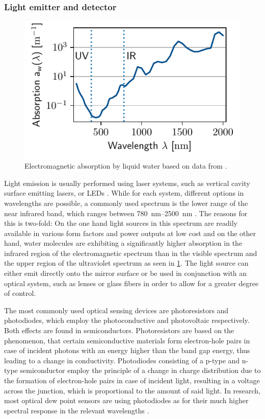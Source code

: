 \subsubsection{Light emitter and detector}
\begin{figure}
    \centering
    \includegraphics{graphs/waterabsorption.pdf}
    \caption{Electromagnetic absorption by liquid water based on data from \autocite{aasVerticalTransferInfrared2006,smithOpticalPropertiesClearest1981}.}
    \label{g:waterabsorption}
\end{figure}
Light emission is usually performed using laser systems, such as vertical cavity surface emitting lasers, or LEDs \autocite{chenHumiditySensorsReview2005,sweeneySemiconductorLasers2017}. While for each system, different options in wavelengths are possible, a commonly used spectrum is the lower range of the near infrared band, which ranges between \qtyrange{780}{2500}{\nano\m} . The reasons for this is two-fold: On the one hand light sources in this spectrum are readily available in various form factors and power outputs at low cost and on the other hand, water molecules are exhibiting a significantly higher absorption in the infrared region of the electromagnetic spectrum than in the visible spectrum and the upper region of the ultraviolet spectrum as seen in \cref{g:waterabsorption}. The light source can either emit directly onto the mirror surface or be used in conjunction with an optical system, such as lenses or glass fibers in order to allow for a greater degree of control.

The most commonly used optical sensing devices are photoresistors and photodiodes, which employ the photoconductive and photovoltaic respectively. Both effects are found in semiconductors. Photoresistors are based on the phenomenon, that certain semiconductive materials form electron-hole pairs in case of incident photons with an energy higher than the band gap energy, thus leading to a change in conductivity. Photodiodes consisting of a p-type and n-type semiconductor employ the principle of a change in charge distribution due to the formation of electron-hole pairs in case of incident light, resulting in a voltage across the junction, which is proportional to the amount of said light.
In research, most optical dew point sensors are using photodiodes as for their much higher spectral response in the relevant wavelengths \autocite{kumeOpticalDetectorsReceivers2017}.


